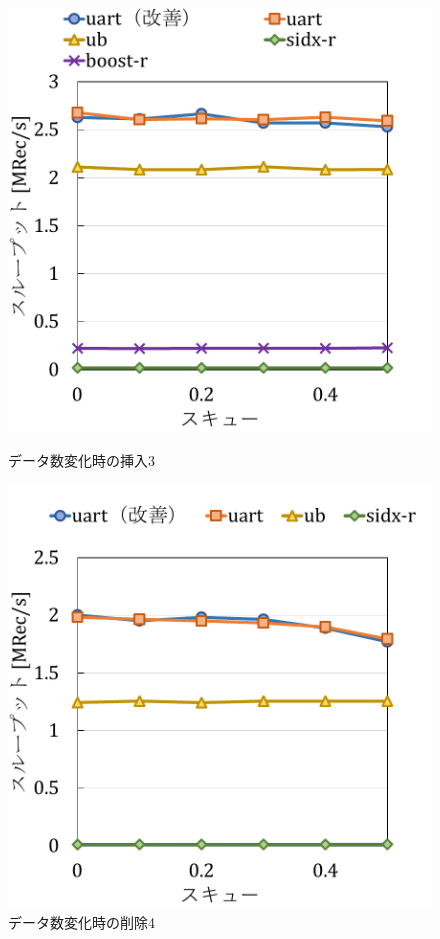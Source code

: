 \begin{figure}[tb]
  \begin{minipage}[c]{0.495\textwidth}
    \centering
    \includegraphics[scale=0.5]{./figures/graph-skew-insert-2.pdf}
    \caption{データ数変化時の挿入3}
    \label{graph:grouped}
  \end{minipage}
  \begin{minipage}[c]{0.495\textwidth}
    \centering
    \includegraphics[scale=0.5]{./figures/graph-skew-insert-8.pdf}
    \caption{データ数変化時の削除4}
    \label{graph:paired}
  \end{minipage}
\end{figure}

